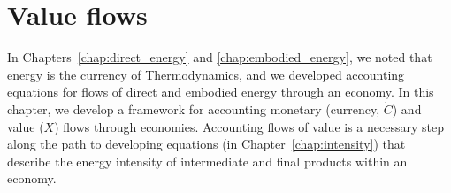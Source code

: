 %
%
%

\chapter{Value flows}
\label{chap:value} %






In Chapters~\ref{chap:direct_energy} and \ref{chap:embodied_energy}, 
we noted that energy is the currency of Thermodynamics,
and we developed accounting equations for flows of 
direct and embodied energy through an economy.
In this chapter, we develop a framework for accounting
monetary (currency, $\dot{C}$) 
and value ($\dot{X}$) flows through economies.
Accounting flows of value is a necessary step along
the path to developing equations (in Chapter~\ref{chap:intensity}) 
that describe the energy intensity of intermediate
and final products within an economy.



